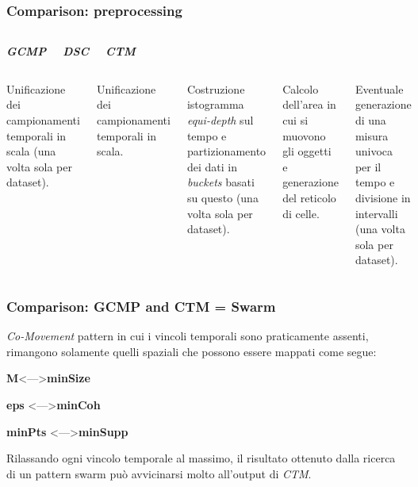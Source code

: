 \documentclass{beamer}
\begin{document}
\begin{frame}
	\frametitle{Comparison: preprocessing}
	\begin{columns}
		
		\begin{center}
			\textbf{\textit{\huge{GCMP}}}
			
		\end{center}
		
		\begin{center}
			\textbf{\textit{\huge{DSC}}}
			
		\end{center}
		
		\begin{center}
			\textbf{\textit{\huge{CTM}}}
			
		\end{center}
	\end{columns}
	\begin{columns}
		
		\column{.3\columnwidth}
		
		Unificazione dei campionamenti temporali in scala  (una volta sola per dataset).
		
		
		\column{.3\textwidth}
		
		Unificazione dei campionamenti temporali in scala.
		
		Costruzione istogramma \textit{equi-depth} sul tempo e partizionamento dei dati in \textit{buckets}
		basati su questo  (una volta sola per dataset).
		
		\column{.3\textwidth}
		
		Calcolo dell'area in cui si muovono gli oggetti e generazione del reticolo di celle.
		
		Eventuale generazione di una misura univoca per il tempo e divisione in intervalli 
		 (una volta sola per dataset).
		
	\end{columns}
\end{frame}  



\begin{frame}
	\frametitle{Comparison: GCMP and CTM = Swarm}
 \textit{Co-Movement} pattern in cui i vincoli temporali sono praticamente assenti, 
 rimangono solamente quelli spaziali che possono essere mappati come segue:
 
 \begin{center}
 	\textbf{M}\textless ---\textgreater  \textbf{minSize}
 	
 	\textbf{eps} \textless ---\textgreater  \textbf{minCoh}
 	
 	\textbf{minPts} \textless ---\textgreater  \textbf{minSupp}
 	
 \end{center}
Rilassando ogni vincolo temporale al massimo, il risultato ottenuto dalla ricerca di un pattern swarm può avvicinarsi molto all'output di \textit{CTM}.
\end{frame}
\end{document}

